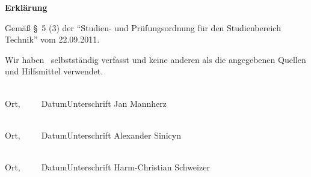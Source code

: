 
\newpage
\thispagestyle{empty}

\begin{center}
\Large\bfseries Erkl\"arung
\end{center}

\noindent
Gem\"a\ss{} \S~5 (3) der "`Studien- und Prüfungsordnung f\"ur den Studienbereich
Technik"' vom 22.09.2011.

\medskip
\noindent
Wir haben \WasErklaerung\ selbstst\"andig verfasst und
keine anderen als die angegebenen Quellen und Hilfsmittel verwendet.

\vspace{3cm}
\noindent
\underline{\hspace{4cm}}\hfill\underline{\hspace{7.25cm}}\\
Ort,~~~~~Datum\hfill Unterschrift Jan Mannherz\hspace{1.25cm}

\vspace{3cm}
\noindent
\underline{\hspace{4cm}}\hfill\underline{\hspace{7.25cm}}\\
Ort,~~~~~Datum\hfill Unterschrift Alexander Sinicyn\hspace{0.80cm}

\vspace{3cm}
\noindent
\underline{\hspace{4cm}}\hfill\underline{\hspace{7.25cm}}\\
Ort,~~~~~Datum\hfill Unterschrift Harm-Christian Schweizer

